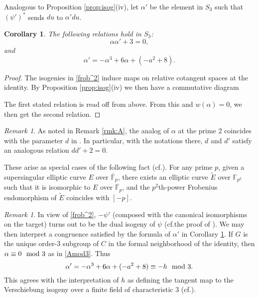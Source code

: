\documentclass{gtpart}
\newtheorem{cor}[thm]{Corollary}
\theoremstyle{definition}
\theoremstyle{remark}
\newtheorem{rmk}[thm]{Remark}
\newcommand{\mb}[1]{\mathbb{#1}}
\newcommand{\cf}{cf.\thinspace}
\newcommand{\BF}{{\mb F}}
\newcommand{\TE}{\widetilde{E}}
\newcommand{\md}{~~{\rm mod}~}
\newcommand{\A}{\alpha}
\newcommand{\isog}[1]{Proposition \ref{prop:isog}\thinspace (#1)}
\begin{document}
Analogous to \isog{iv}, let $\A'$ be the element in $S_3$ such that $(\psi')^*$ sends $du$ to $\A' du$.  

\begin{cor}
\label{cor:A'}
 The following relations hold in $S_3$: 
 \[
  \A \A' + 3 = 0, 
 \]
 and 
 \[
  \A' = -\A^3 + 6 \A + (-a^2 + 8).  
 \]
\end{cor}
\begin{proof}
 The isogenies in \eqref{frob^2} induce maps on relative cotangent spaces at the identity.  
 By \isog{iv} we then have a commutative diagram 
 \begin{center}
 \end{center}
 The first stated relation is read off from above.  From this and $w(\A) = 0$, we then get the second relation.  
\end{proof}

\begin{rmk}
\label{rmk:AA'}
 As noted in Remark \ref{rmk:A}, the analog of $\A$ at the prime 2 coincides with the parameter $d$ in \cite[Section 3]{h2p2}.  
 In particular, with the notations there, $d$ and $d'$ satisfy an analogous relation $d d' + 2 = 0$.   

 These arise as special cases of the following fact (\cf \cite[Lemma 3.21]{poonen}).  
 For any prime $p$, given a supersingular elliptic curve $E$ over $\overline{\BF}_p$, 
 there exists an elliptic curve $\TE$ over $\BF_{p^2}$ such that it is isomorphic to $E$ over $\overline{\BF}_p$, 
 and the $p^2$th-power Frobenius endomorphism of $\TE$ coincides with $[-p]$.  
\end{rmk}

\begin{rmk}
\label{rmk:A'}
 In view of \eqref{frob^2}, $-\psi'$ (composed with the canonical isomorphisms on the target) 
 turns out to be the dual isogeny of $\psi$ (\cf the proof of \cite[Theorem 2.9.4]{KM}).  
 We may then interpret a congruence satisfied by the formula of $\A'$ in Corollary \ref{cor:A'}.  
 If $G$ is the unique order-3 subgroup of $C$ in the formal neighborhood of the identity, then $\A \equiv 0 \md 3$ as in \eqref{Amod3}.  
 Thus 
 \[
  \A' = -\A^3 + 6 \A + (-a^2 + 8) \equiv -h \md 3.  
 \]
 This agrees with the interpretation of $h$ as defining the tangent map to the Verschiebung isogeny over a finite field of characteristic 3 (\cf \cite[12.4.1]{KM}).  
\end{rmk}
\end{document}
